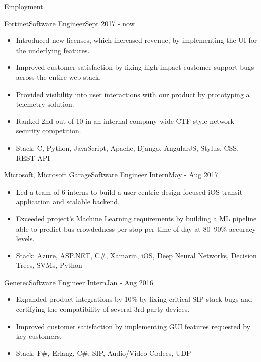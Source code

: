 \documentclass[]{muchicv}
\begin{document}
	\makeheader
	
	\begin{cvsection}{Employment}
		\begin{cvsubsection}{Fortinet}{Software Engineer}{Sept 2017 - now}
			\begin{itemize}
				\item Introduced new licenses, which increased revenue, by implementing the UI for the underlying features.
				\item Improved customer satisfaction by fixing high-impact customer support bugs across the entire web stack.
				\item Provided visibility into user interactions with our product by prototyping a telemetry solution.
				\item Ranked 2nd out of 10 in an internal company-wide CTF-style network security competition.
				\item Stack: C, Python, JavaScript, Apache, Django, AngularJS, Stylus, CSS, REST API
			\end{itemize}
		\end{cvsubsection}
		
		\begin{cvsubsection}{Microsoft, Microsoft Garage}{Software Engineer Intern}{May - Aug 2017}
			\begin{itemize}
				\item Led a team of 6 interns to build a user-centric design-focused iOS transit application and scalable backend.
				\item Exceeded project's Machine Learning requirements by building a ML pipeline able to predict bus crowdedness per stop per time of day at 80--90\% accuracy levels.
				\item Stack: Azure, ASP.NET, C\#, Xamarin, iOS, Deep Neural Networks, Decision Trees, SVMs, Python
			\end{itemize}
		\end{cvsubsection}
		
		\begin{cvsubsection}{Genetec}{Software Engineer Intern}{Jan - Aug 2016}
			\begin{itemize}
				\item Expanded product integrations by 10\% by fixing critical SIP stack bugs and certifying the compatibility of several 3rd party devices.
				\item Improved customer satisfaction by implementing GUI features requested by key customers.
				\item Stack: F\#, Erlang, C\#, SIP, Audio/Video Codecs, UDP
			\end{itemize}
		\end{cvsubsection}


\end{cvsection}
\end{document}
